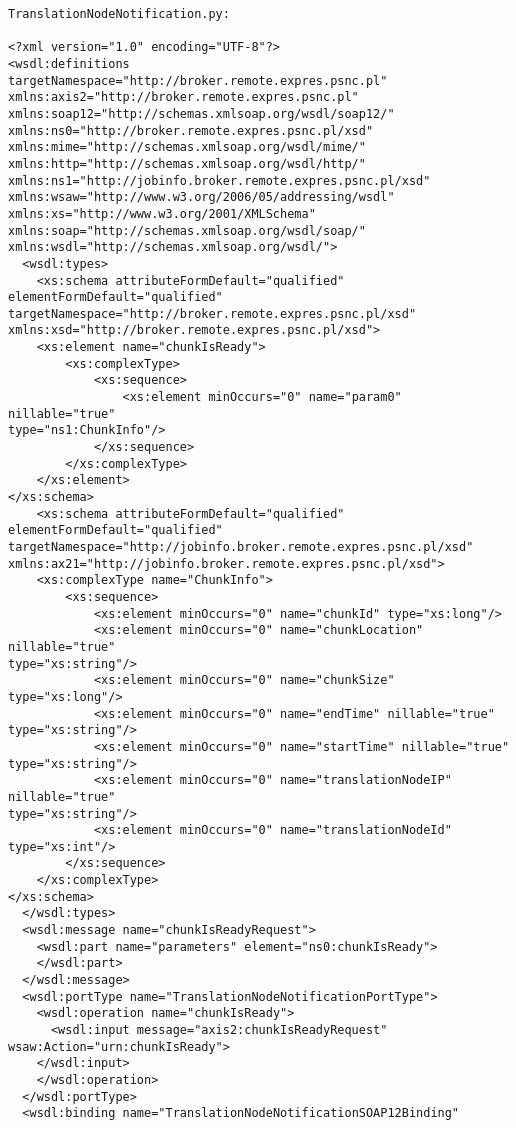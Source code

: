 \begin{verbatim}
TranslationNodeNotification.py:

<?xml version="1.0" encoding="UTF-8"?>
<wsdl:definitions targetNamespace="http://broker.remote.expres.psnc.pl"
xmlns:axis2="http://broker.remote.expres.psnc.pl"
xmlns:soap12="http://schemas.xmlsoap.org/wsdl/soap12/"
xmlns:ns0="http://broker.remote.expres.psnc.pl/xsd"
xmlns:mime="http://schemas.xmlsoap.org/wsdl/mime/"
xmlns:http="http://schemas.xmlsoap.org/wsdl/http/"
xmlns:ns1="http://jobinfo.broker.remote.expres.psnc.pl/xsd"
xmlns:wsaw="http://www.w3.org/2006/05/addressing/wsdl"
xmlns:xs="http://www.w3.org/2001/XMLSchema"
xmlns:soap="http://schemas.xmlsoap.org/wsdl/soap/"
xmlns:wsdl="http://schemas.xmlsoap.org/wsdl/">
  <wsdl:types>
    <xs:schema attributeFormDefault="qualified" elementFormDefault="qualified"
targetNamespace="http://broker.remote.expres.psnc.pl/xsd"
xmlns:xsd="http://broker.remote.expres.psnc.pl/xsd">
    <xs:element name="chunkIsReady">
        <xs:complexType>
            <xs:sequence>
                <xs:element minOccurs="0" name="param0" nillable="true"
type="ns1:ChunkInfo"/>
            </xs:sequence>
        </xs:complexType>
    </xs:element>
</xs:schema>
    <xs:schema attributeFormDefault="qualified" elementFormDefault="qualified"
targetNamespace="http://jobinfo.broker.remote.expres.psnc.pl/xsd"
xmlns:ax21="http://jobinfo.broker.remote.expres.psnc.pl/xsd">
    <xs:complexType name="ChunkInfo">
        <xs:sequence>
            <xs:element minOccurs="0" name="chunkId" type="xs:long"/>
            <xs:element minOccurs="0" name="chunkLocation" nillable="true"
type="xs:string"/>
            <xs:element minOccurs="0" name="chunkSize" type="xs:long"/>
            <xs:element minOccurs="0" name="endTime" nillable="true"
type="xs:string"/>
            <xs:element minOccurs="0" name="startTime" nillable="true"
type="xs:string"/>
            <xs:element minOccurs="0" name="translationNodeIP" nillable="true"
type="xs:string"/>
            <xs:element minOccurs="0" name="translationNodeId" type="xs:int"/>
        </xs:sequence>
    </xs:complexType>
</xs:schema>
  </wsdl:types>
  <wsdl:message name="chunkIsReadyRequest">
    <wsdl:part name="parameters" element="ns0:chunkIsReady">
    </wsdl:part>
  </wsdl:message>
  <wsdl:portType name="TranslationNodeNotificationPortType">
    <wsdl:operation name="chunkIsReady">
      <wsdl:input message="axis2:chunkIsReadyRequest"
wsaw:Action="urn:chunkIsReady">
    </wsdl:input>
    </wsdl:operation>
  </wsdl:portType>
  <wsdl:binding name="TranslationNodeNotificationSOAP12Binding"

\end{verbatim}
